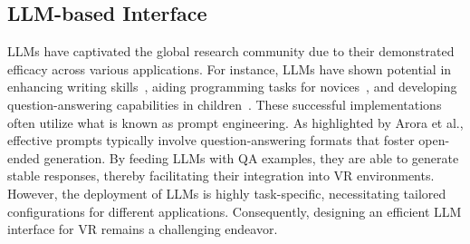 \subsection{LLM-based Interface}
LLMs have captivated the global research community due to their demonstrated efficacy across various applications. For instance, LLMs have shown potential in enhancing writing skills~\cite{jakesch2023co}, aiding programming tasks for novices~\cite{kazemitabaar2023novices}, and developing question-answering capabilities in children~\cite{abdelghani2024}. These successful implementations often utilize what is known as prompt engineering. As highlighted by Arora et al., effective prompts typically involve question-answering formats that foster open-ended generation. By feeding LLMs with QA examples, they are able to generate stable responses, thereby facilitating their integration into VR environments. However, the deployment of LLMs is highly task-specific, necessitating tailored configurations for different applications. Consequently, designing an efficient LLM interface for VR remains a challenging endeavor.

